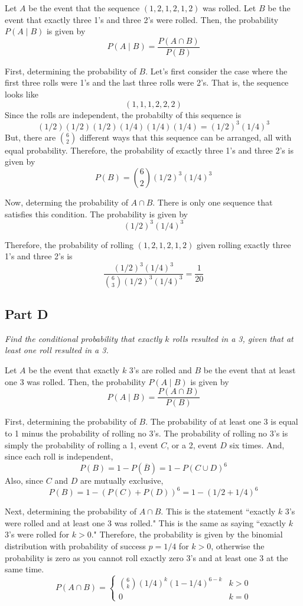 \documentclass{article}
\begin{document}
\bigbreak

Let $ A $ be the event that the sequence $ (1, 2, 1, 2, 1, 2) $ was rolled.
Let $ B $ be the event that exactly three 1's and three 2's were rolled. Then,
the probability $ P(A \mid B) $ is given by
$$ P(A \mid B) = \frac{P(A \cap B)}{P(B)} $$

First, determining the probability of $ B $. Let's first consider the case
where the first three rolls were 1's and the last three rolls were 2's. That
is, the sequence looks like
$$ (1, 1, 1, 2, 2, 2) $$
Since the rolls are independent, the probabilty of this sequence is
$$ (1/2)(1/2)(1/2)(1/4)(1/4)(1/4) = (1/2)^3 (1/4)^3 $$
But, there are $ \binom{6}{2} $ different ways that this sequence can be
arranged, all with equal probability. Therefore, the probability of exactly
three 1's and three 2's is given by
$$ P(B) = \binom{6}{2} (1/2)^3 (1/4)^3 $$

Now, determing the probability of $ A \cap B $. There is only one sequence
that satisfies this condition. The probability is given by
$$ (1/2)^3 (1/4)^3 $$

Therefore, the probability of rolling $ (1, 2, 1, 2, 1, 2) $ given rolling
exactly three 1's and three 2's is
$$ \frac{ (1/2)^3 (1/4)^3 }{\binom{6}{3} (1/2)^3 (1/4)^3} = \frac{1}{20} $$

\subsection*{Part D}

\textit{Find the conditional probability that exactly $ k $ rolls resulted in
a 3, given that at least one roll resulted in a 3.}

\bigbreak

Let $ A $ be the event that exactly $ k $ 3's are rolled and $ B $ be the
event that at least one 3 was rolled. Then, the probability $ P(A \mid B) $
is given by
$$ P(A \mid B) = \frac{P(A \cap B)}{P(B)} $$

First, determining the probability of $ B $. The probability of at least one
3 is equal to 1 minus the probability of rolling no 3's. The probability of
rolling no 3's is simply the probability of rolling a 1, event $C$, or a 2,
event $D$ six times. And, since each roll is independent,
$$ P(B) = 1 - P(\overline{B}) = 1 - P(C \cup D)^6 $$
Also, since $ C $ and $ D $ are mutually exclusive,
$$ P(B) = 1 - (P(C) + P(D))^6 = 1 - (1/2 + 1/4)^6 $$

Next, determining the probability of $ A \cap B $. This is the statement
``exactly $k$ 3's were rolled and at least one 3 was rolled." This is the same
as saying ``exactly $k$ 3's were rolled for $ k > 0 $." Therefore, the probability
is given by the binomial distribution with probability of success $ p = 1/4 $
for $ k > 0 $, otherwise the probability is zero as you cannot roll exactly
zero 3's and at least one 3 at the same time.
$$ P(A \cap B) = \begin{cases}
    \binom{6}{k} (1/4)^k (1 - 1/4)^{6 - k} & k > 0 \\
    0 & k = 0
\end{cases} $$
\end{document}
